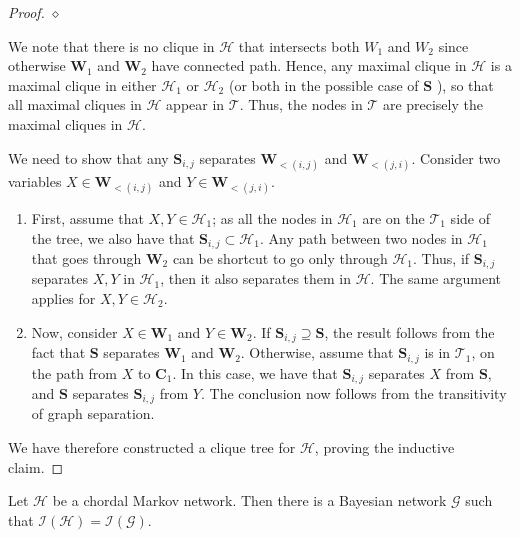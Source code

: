 \documentclass{article}
\begin{document}
\begin{proof}
$\diamond$ 

 We note that there is no clique in $\mathcal{H}$ that intersects both $W_{1}$ and $W_{2}$ since otherwise $\boldsymbol{W}_1$ and $\boldsymbol{W}_2$ have connected path. Hence, any maximal clique in $\mathcal{H}$ is a maximal clique in either $\mathcal{H}_{1}$ or $\mathcal{H}_{2}$ (or both in the possible case of $\boldsymbol{S}$ ), so that {all maximal cliques in $\mathcal{H}$ appear in $\mathcal{T}$}. 
Thus, the nodes in $\mathcal{T}$ are precisely the maximal cliques in $\mathcal{H}$. 

 We need to show that any $\boldsymbol{S}_{i, j}$ separates $\boldsymbol{W}_{<(i, j)}$ and $\boldsymbol{W}_{<(j, i)} .$  Consider two variables $X \in \boldsymbol{W}_{<(i, j)}$ and $Y \in \boldsymbol{W}_{<(j, i)} .$ 
\begin{enumerate}
    \item First, assume that $X, Y \in \mathcal{H}_{1}$; as all the nodes in $\mathcal{H}_{1}$ are on the $\mathcal{T}_{1}$ side of the tree, we also have that $\boldsymbol{S}_{i, j} \subset \mathcal{H}_{1}$. Any path between two nodes in $\mathcal{H}_{1}$ that goes through $\boldsymbol{W}_{2}$ can be shortcut to go only through $\mathcal{H}_{1}$. Thus, if $\boldsymbol{S}_{i, j}$ separates $X, Y$ in $\mathcal{H}_{1}$, then it also separates them in $\mathcal{H}$. The same argument applies for $X, Y \in \mathcal{H}_{2}$.
    \item Now, consider $X \in \boldsymbol{W}_{1}$ and $Y \in \boldsymbol{W}_{2}$. If $\boldsymbol{S}_{i, j}\supseteq\boldsymbol{S}$, the result follows from the fact that $\boldsymbol{S}$ separates $\boldsymbol{W}_{1}$ and $\boldsymbol{W}_{2}$. Otherwise, assume that $\boldsymbol{S}_{i, j}$ is in $\mathcal{T}_{1}$, on the path from $X$ to $\boldsymbol{C}_{1}$.
    In this case, we have that $\boldsymbol{S}_{i, j}$ separates $X$ from $\boldsymbol{S}$, and $\boldsymbol{S}$ separates $\boldsymbol{S}_{i, j}$ from $Y$. The conclusion now follows from the transitivity of graph separation.
\end{enumerate} 
We have therefore constructed a clique tree for $\mathcal{H}$, proving the inductive claim.
\end{proof}
\begin{thma}\label{thm:adfadf}
Let $\mathcal{H}$ be a chordal Markov network. Then there is a Bayesian network $\mathcal{G}$ such that $\mathcal{I}(\mathcal{H})=\mathcal{I}(\mathcal{G})$.
\end{thma}
\end{document}
